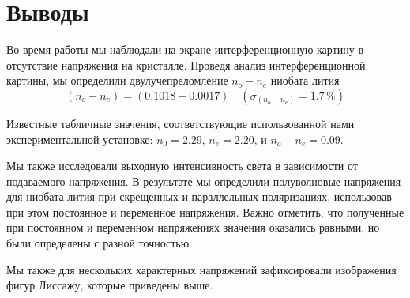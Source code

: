 \documentclass[12pt]{article}
\begin{document}
\section*{Выводы}
\par
	Во время работы мы наблюдали на экране интерференционную картину в отсутствие напряжения на кристалле.  Проведя анализ интерференционной картины, мы определили двулучепреломление $n_o - n_e$ ниобата лития
\[
	\left(n_o - n_e \right) = \left( 0.1018 \pm 0.0017 \right) \quad \left( \sigma_\text{$\left( n_o - n_e \right)$}  = 1.7 \, \% \right)
\]	
\par
	Известные табличные значения, соответствующие использованной нами экспериментальной установке: $n_0 = 2.29$, $n_e = 2.20$, и $n_o - n_e = 0.09$.
\par
	Мы также исследовали выходную интенсивность света в зависимости от подаваемого напряжения. В результате мы определили полуволновые напряжения для ниобата лития при скрещенных и параллельных поляризациях, использовав при этом постоянное и переменное напряжения. Важно отметить, что полученные при постоянном и переменном напряжениях значения оказались равными, но были определены с разной точностью.
\par
	Мы также для нескольких характерных напряжений зафиксировали изображения фигур Лиссажу, которые приведены выше.
\end{document}
